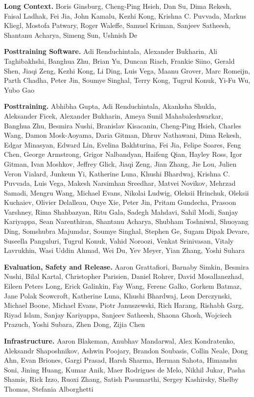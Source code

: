 \documentclass[11pt, logo, onecolumn, copyright, colorlinks=true, allcolors=blue]{nvidiatechreport}
\begin{document}
\textbf{Long Context.} Boris Ginsburg, Cheng-Ping Hsieh, Dan Su, Dima Rekesh, Faisal Ladhak, Fei Jia, John Kamalu, Kezhi Kong, Krishna C. Puvvada, Markus Kliegl, Mostofa Patwary, Roger Waleffe, Samuel Kriman, Sanjeev Satheesh, Shantanu Acharya, Simeng Sun, Ushnish De

\textbf{Posttraining Software.} Adi Renduchintala, Alexander Bukharin, Ali Taghibakhshi, Banghua Zhu, Brian Yu, Duncan Riach, Frankie Siino, Gerald Shen, Jiaqi Zeng, Kezhi Kong, Li Ding, Luis Vega, Maanu Grover, Marc Romeijn, Parth Chadha, Peter Jin, Soumye Singhal, Terry Kong, Tugrul Konuk, Yi-Fu Wu, Yubo Gao

\textbf{Posttraining.} Abhibha Gupta, Adi Renduchintala, Akanksha Shukla, Aleksander Ficek, Alexander Bukharin, Ameya Sunil Mahabaleshwarkar, Banghua Zhu, Besmira Nushi, Branislav Kisacanin, Cheng-Ping Hsieh, Charles Wang, Damon Mosk-Aoyama, Daria Gitman, Dhruv Nathawani, Dima Rekesh, Edgar Minasyan, Edward Lin, Evelina Bakhturina, Fei Jia, Felipe Soares, Feng Chen, George Armstrong, Grigor Nalbandyan, Haifeng Qian, Hayley Ross, Igor Gitman, Ivan Moshkov, Jeffrey Glick, Jiaqi Zeng, Jian Zhang, Jie Lou, Julien Veron Vialard, Junkeun Yi, Katherine Luna, Khushi Bhardwaj, Krishna C. Puvvada, Luis Vega, Makesh Narsimhan Sreedhar, Matvei Novikov, Mehrzad Samadi, Mengru Wang, Michael Evans, Nikolai Ludwig, Oleksii Hrinchuk, Oleksii Kuchaiev, Olivier Delalleau, Ouye Xie, Peter Jin, Pritam Gundecha, Prasoon Varshney, Rima Shahbazyan, Ritu Gala, Sadegh Mahdavi, Sahil Modi, Sanjay Kariyappa, Sean Narenthiran, Shantanu Acharya, Shubham Toshniwal, Shuoyang Ding, Somshubra Majumdar, Soumye Singhal, Stephen Ge, Sugam Dipak Devare, Suseella Panguluri, Tugrul Konuk, Vahid Noroozi, Venkat Srinivasan, Vitaly Lavrukhin, Wasi Uddin Ahmad, Wei Du, Yev Meyer, Yian Zhang, Yoshi Suhara

\textbf{Evaluation, Safety and Release.} Aaron Grattafiori, Barnaby Simkin, Besmira Nushi, Bilal Kartal, Christopher Parisien, Daniel Rohrer, David Mosallanezhad, Eileen Peters Long, Erick Galinkin, Fay Wang, Ferenc Galko, Gorkem Batmaz, Jane Polak Scowcroft, Katherine Luna, Khushi Bhardwaj, Leon Derczynski, Michael Boone, Michael Evans, Piotr Januszewski, Rich Harang, Rishabh Garg, Riyad Islam, Sanjay Kariyappa, Sanjeev Satheesh, Shaona Ghosh, Wojciech Prazuch, Yoshi Subara, Zhen Dong, Zijia Chen

\textbf{Infrastructure.} Aaron Blakeman, Anubhav Mandarwal, Alex Kondratenko, Aleksandr Shaposhnikov, Ashwin Poojary, Brandon Soubasis, Collin Neale, Dong Ahn, Evan Briones, Gargi Prasad, Harsh Sharma, Herman Sahota, Himanshu Soni, Jining Huang, Kumar Anik, Maer Rodrigues de Melo, Nikhil Jukar, Pasha Shamis, Rick Izzo, Ruoxi Zhang, Satish Pasumarthi, Sergey Kashirsky, Shelby Thomas, Stefania Alborghetti
\end{document}
